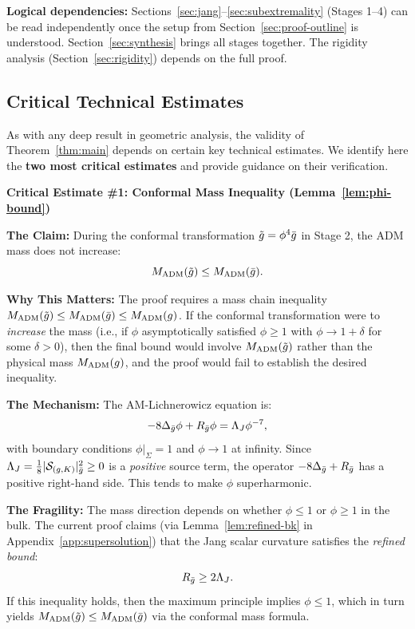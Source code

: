 \textbf{Logical dependencies:} Sections~\ref{sec:jang}--\ref{sec:subextremality} (Stages 1--4) can be read independently once the setup from Section~\ref{sec:proof-outline} is understood. Section~\ref{sec:synthesis} brings all stages together. The rigidity analysis (Section~\ref{sec:rigidity}) depends on the full proof.

\subsection{Critical Technical Estimates}\label{subsec:critical-estimates}

As with any deep result in geometric analysis, the validity of Theorem~\ref{thm:main} depends on certain key technical estimates. We identify here the \textbf{two most critical estimates} and provide guidance on their verification.

\textbf{Critical Estimate \#1: Conformal Mass Inequality (Lemma~\ref{lem:phi-bound})}

\textbf{The Claim:} During the conformal transformation $\tilde{g} = \phi^4 \bar{g}$ in Stage 2, the ADM mass does not increase:
\[
M_{\mathrm{ADM}}(\tilde{g}) \leq M_{\mathrm{ADM}}(\bar{g}).
\]

\textbf{Why This Matters:} The proof requires a mass chain inequality $M_{\mathrm{ADM}}(\tilde{g}) \leq M_{\mathrm{ADM}}(\bar{g}) \leq M_{\mathrm{ADM}}(g)$. If the conformal transformation were to \emph{increase} the mass (i.e., if $\phi$ asymptotically satisfied $\phi \geq 1$ with $\phi \to 1 + \delta$ for some $\delta > 0$), then the final bound would involve $M_{\mathrm{ADM}}(\tilde{g})$ rather than the physical mass $M_{\mathrm{ADM}}(g)$, and the proof would fail to establish the desired inequality.

\textbf{The Mechanism:} The AM-Lichnerowicz equation is:
\[
-8\Delta_{\bar{g}}\phi + R_{\bar{g}}\phi = \Lambda_J \phi^{-7},
\]
with boundary conditions $\phi|_\Sigma = 1$ and $\phi \to 1$ at infinity. Since $\Lambda_J = \frac{1}{8}|\mathcal{S}_{(g,K)}|^2_{\bar{g}} \geq 0$ is a \emph{positive} source term, the operator $-8\Delta_{\bar{g}} + R_{\bar{g}}$ has a positive right-hand side. This tends to make $\phi$ superharmonic.

\textbf{The Fragility:} The mass direction depends on whether $\phi \leq 1$ or $\phi \geq 1$ in the bulk. The current proof claims (via Lemma~\ref{lem:refined-bk} in Appendix~\ref{app:supersolution}) that the Jang scalar curvature satisfies the \emph{refined bound}:
\begin{equation}\label{eq:refined-bk-intro}
R_{\bar{g}} \geq 2\Lambda_J.
\end{equation}
If this inequality holds, then the maximum principle implies $\phi \leq 1$, which in turn yields $M_{\mathrm{ADM}}(\tilde{g}) \leq M_{\mathrm{ADM}}(\bar{g})$ via the conformal mass formula.

